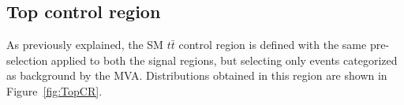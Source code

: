 \documentclass[a4paper, 10pt, openright]{report}
\begin{document}
\subsection{Top control region} \label{section:TopCR}

As previously explained, the \ac{SM} $t \bar t$ control region is defined with the same pre-selection applied to both the signal regions, but selecting only events categorized as background by the \ac{MVA}. Distributions obtained in this region are shown in Figure~\ref{fig:TopCR}.

\begin{figure}[htbp]
\centering
{}
\end{figure}
\end{document}
